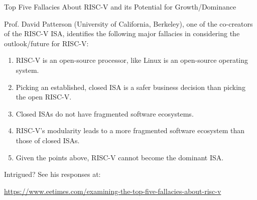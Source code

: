 \documentclass{article}
\begin{document}
\clearpage


\begin{center}
  {\Huge Top Five Fallacies About RISC-V and its Potential for Growth/Dominance}

  \vspace{1in}

  \begin{minipage}{9in}\LARGE
    Prof. David Patterson (University of California, Berkeley), one of
    the co-creators of the RISC-V ISA, identifies the following major
    fallacies in considering the outlook/future for RISC-V:

    \vspace{0.5in}

    \begin{enumerate}\Large

    \item RISC-V is an open-source processor, like Linux is an open-source operating system.

    \item Picking an established, closed ISA is a safer business decision than picking the open RISC-V.

    \item Closed ISAs do not have fragmented software ecosystems.

    \item RISC-V’s modularity leads to a more fragmented software ecosystem than those of closed ISAs.

    \item Given the points above, RISC-V cannot become the dominant ISA.

    \end{enumerate}

    \vspace{0.5in}

    Intrigued? See his responses at:

    \begin{center}
      \url{https://www.eetimes.com/examining-the-top-five-fallacies-about-risc-v}
    \end{center}
\end{minipage}

\end{center}

\clearpage

\end{document}
